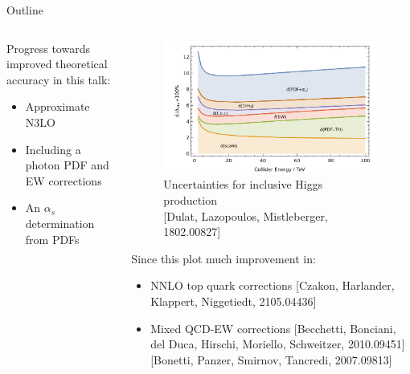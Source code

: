 \documentclass[8pt,t]{beamer}
\begin{document}
\begin{frame}[c]{Outline}
  \begin{columns}
    \begin{column}{0.55\textwidth}
      \vspace*{0.5em}
      Progress towards improved theoretical accuracy in this talk:
      \begin{itemize}
        \item Approximate N3LO
        \item Including a photon PDF and EW corrections
        \item An $\alpha_s$ determination from PDFs
      \end{itemize}
    \end{column}
    \begin{column}{0.44\textwidth}
      \begin{figure}
        \centering
        \includegraphics[width=0.99\textwidth]{figures/sources_of_unc_higgs.png}
        \caption*{ \small Uncertainties for inclusive Higgs production \\  {\color{gray}\footnotesize [Dulat, Lazopoulos, Mistleberger, 1802.00827]}}
      \end{figure}

      Since this plot much improvement in:
      \begin{itemize}
        \item NNLO top quark corrections {\color{gray}\footnotesize[Czakon, Harlander, Klappert, Niggetiedt, 2105.04436]}
        \item Mixed QCD-EW corrections {\color{gray}\footnotesize[Becchetti, Bonciani, del Duca, Hirschi, Moriello, Schweitzer, 2010.09451] [Bonetti, Panzer, Smirnov, Tancredi, 2007.09813]}
      \end{itemize}
    \end{column}
  \end{columns}
\end{frame}
\end{document}
